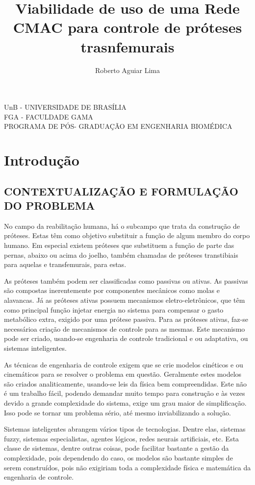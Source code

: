 \documentclass[a4paper, 12pt] {report}
\title{Viabilidade de uso de uma Rede CMAC para controle de pr\'oteses trasnfemurais}
\author{Roberto Aguiar Lima}
\begin{document}
	UnB - UNIVERSIDADE DE BRAS\'ILIA\\
	FGA - FACULDADE GAMA\\
	PROGRAMA DE P\'OS- GRADUA\c{C}\~AO EM ENGENHARIA BIOM\'EDICA
	\maketitle
	
	\chapter{Introdução}
		\section {CONTEXTUALIZAÇÃO E FORMULAÇÃO DO PROBLEMA}

No campo da reabilitação humana, há o subcampo que trata da construção de próteses. Estas têm como objetivo substituir a função de algum membro do corpo humano. Em especial existem próteses que substituem a função de parte das pernas, abaixo ou acima do joelho, também chamadas de próteses transtibiais para aquelas e transfemurais, para estas.

	As próteses também podem ser classificadas como passivas ou ativas. As passivas são compostas inerentemente por componentes mecânicos como molas e alavancas. Já as próteses ativas possuem mecanismos eletro-eletrônicos, que têm como principal função injetar energia no sistema para compensar o gasto metabólico extra, exigido por uma prótese passiva. Para as próteses ativas, faz-se necessárioa criação de mecanismos de controle para as mesmas. Este mecanismo pode ser criado, usando-se engenharia de controle tradicional e ou adaptativa, ou sistemas inteligentes.

	As técnicas de engenharia de controle exigem que se crie modelos cinéticos e ou cinemáticos para se resolver o problema em questão. Geralmente estes modelos são criados analiticamente, usando-se leis da física bem compreendidas. Este não é um trabalho fácil, podendo demandar muito tempo para construção e às vezes devido a grande complexidade do sistema, exige um grau maior de simplificação. Isso pode se tornar um problema sério, até mesmo inviabilizando a solução.

	Sistemas inteligentes abrangem vários tipos de tecnologias. Dentre elas, sistemas fuzzy, sistemas especialistas, agentes lógicos, redes neurais artificiais, etc. Esta classe de sistemas, dentre outras coisas, pode facilitar bastante a gestão da complexidade, pois dependendo do caso, os modelos são bastante simples de serem construídos, pois não exigiriam toda a complexidade física e matemática da engenharia de controle.
\end{document}
